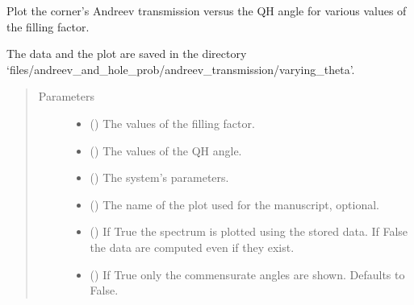 \documentclass[letterpaper,10pt,english]{sphinxmanual}
\begin{document}
\begin{fulllineitems}
\label{\detokenize{modules:modules.utils.plot_tau_vs_theta_qh_various_fillings}}
\pysigstartsignatures
{}
\pysigstopsignatures
\sphinxAtStartPar
Plot the corner’s Andreev transmission versus the QH angle for various values of the filling factor.

\sphinxAtStartPar
The data and the plot are saved in the directory 
‘files/andreev\_and\_hole\_prob/andreev\_transmission/varying\_theta’.
\begin{quote}\begin{description}
\item[{Parameters}] \leavevmode\begin{itemize}
\item {} 
\sphinxAtStartPar
{} () \textendash{} The values of the filling factor.

\item {} 
\sphinxAtStartPar
{} () \textendash{} The values of the QH angle.

\item {} 
\sphinxAtStartPar
{} () \textendash{} The system’s parameters.

\item {} 
\sphinxAtStartPar
{} () \textendash{} The name of the plot used for the manuscript, optional.

\item {} 
\sphinxAtStartPar
{} () \textendash{} If True the spectrum is plotted using the stored data.
If False the data are computed even if they exist.

\item {} 
\sphinxAtStartPar
{} () \textendash{} If True only the commensurate angles are shown. Defaults to False.

\end{itemize}

\end{description}\end{quote}

\end{fulllineitems}
\end{document}
